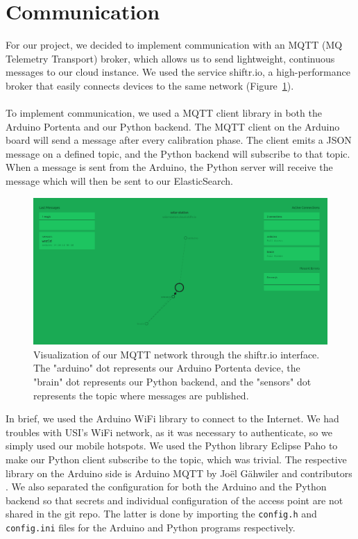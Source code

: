 \section{Communication}

For our project, we decided to implement communication with an MQTT (MQ Telemetry Transport) broker, which allows us to send lightweight, continuous messages to our cloud instance.
We used the service shiftr.io, a high-performance broker that easily connects devices to the same network (Figure~\ref{fig:shiftrviz}). \\ \\
To implement communication, we used a MQTT client library in both the Arduino Portenta and our Python backend.
The MQTT client on the Arduino board will send a message after every calibration phase.
The client emits a JSON message on a defined topic, and the Python backend will subscribe to that topic.
When a message is sent from the Arduino, the Python server will receive the message which will then be sent to our ElasticSearch.
\begin{figure}[H]
    \centering
    \includegraphics[width=15cm]{../assets/png/shiftr-network}
    \caption{Visualization of our MQTT network through the shiftr.io interface. The "arduino" dot represents our Arduino Portenta device, the "brain" dot represents our Python backend, and the "sensors" dot represents the topic where messages are published.}
    \label{fig:shiftrviz}
\end{figure}
In brief, we used the Arduino WiFi library to connect to the Internet. We had
troubles with USI's WiFi network, as it was necessary to authenticate, so we
simply used our mobile hotspots. We used the Python library Eclipse Paho
\cite{paho} to make our Python client subscribe to the topic, which was trivial.
The respective library on the Arduino side is Arduino MQTT by Joël Gähwiler and
contributors \cite{arduinomqtt}. We also separated the configuration for both
the Arduino and the Python backend so that secrets and individual configuration
of the access point are not shared in the git repo. The latter is done by
importing the \texttt{config.h} and \texttt{config.ini} files for the Arduino
and Python programs respectively.

